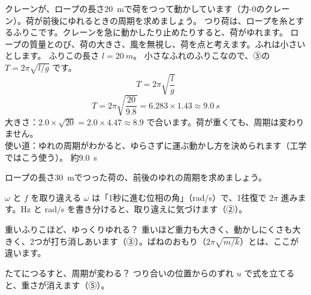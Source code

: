 \label{ph:波-1:ex13}
\begin{phreidai}[クレーンのつり荷のゆれ]
クレーンが、ロープの長さ\qty{20}{m}で荷をつって動かしています（力-0のクレーン）。荷が前後にゆれるときの周期を求めましょう。
\phbamen
つり荷は、ロープを糸とするふりこです。クレーンを急に動かしたり止めたりすると、荷がゆれます。
\phmushi
ロープの質量とのび、荷の大きさ、風を無視し、荷を点と考えます。ふれは小さいとします。
\phzu
ふりこの長さ $l=\qty{20}{m}$。
\phriyu
小さなふれのふりこなので、③の $T=2\pi\sqrt{l/g}$ です。
\phtateru
\[T=2\pi\sqrt{\frac{l}{g}}\]
\phtoku
\[T=2\pi\sqrt{\frac{20}{9.8}}=6.283\times1.43\approx\qty{9.0}{s}\]
\phtashikame
大きさ：$2.0\times\sqrt{20}=2.0\times4.47\approx8.9$ で合います。荷が重くても、周期は変わりません。\\
使い道：ゆれの周期がわかると、ゆらさずに運ぶ動かし方を決められます（工学ではこう使う）。
\kotae 約\qty{9.0}{s}
\end{phreidai}
\begin{jibun}
ロープの長さ\qty{30}{m}でつった荷の、前後のゆれの周期を求めましょう。
\end{jibun}

\begin{tsumazuki}{$\omega$ と $f$ を取り違える}
$\omega$ は「1秒に進む位相の角」（rad/s）で、1往復で $2\pi$ 進みます。Hz と rad/s を書き分けると、取り違えに気づけます（②）。
\end{tsumazuki}

\begin{tsumazuki}{重いふりこほど、ゆっくりゆれる？}
重いほど重力も大きく、動かしにくさも大きく、2つが打ち消しあいます（③）。ばねのおもり（$2\pi\sqrt{m/k}$）とは、ここが違います。
\end{tsumazuki}

\begin{tsumazuki}{たてにつるすと、周期が変わる？}
つり合いの位置からのずれ $u$ で式を立てると、重さが消えます（⑤）。
\end{tsumazuki}

